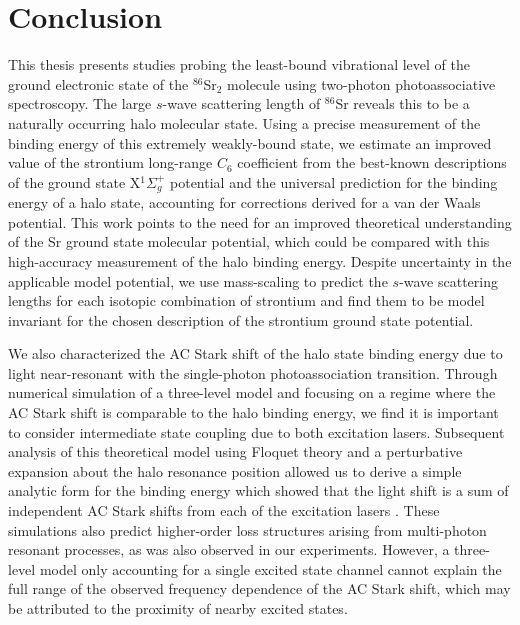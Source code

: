 \chapter{Conclusion} \label{ch:conclusion}
This thesis presents studies probing the least-bound vibrational level of the ground electronic state of the $^{86}$Sr$_2$ molecule using two-photon photoassociative spectroscopy.
The large $s$-wave scattering length of $^{86}$Sr reveals this to be a naturally occurring halo molecular state.
Using a precise measurement of the binding energy of this extremely weakly-bound state, we estimate an improved value of the strontium long-range $C_6$ coefficient from the best-known descriptions of the ground state X$^1\Sigma_g^+$ potential and the universal prediction for the binding energy of a halo state, accounting for corrections derived for a van der Waals potential.
This work points to the need for an improved theoretical understanding of the Sr ground state molecular potential, which could be compared with this high-accuracy measurement of the halo binding energy.
Despite uncertainty in the applicable model potential, we use mass-scaling to predict the $s$-wave scattering lengths for each isotopic combination of strontium and find them to be model invariant for the chosen description of the strontium ground state potential.

We also characterized the AC Stark shift of the halo state binding energy due to light near-resonant with the single-photon photoassociation transition. 
Through numerical simulation of a three-level model and focusing on a regime where the AC Stark shift is comparable to the halo binding energy, we find it is important to consider intermediate state coupling due to both excitation lasers.
Subsequent analysis of this theoretical model using Floquet theory and a perturbative expansion about the halo resonance position allowed us to derive a simple analytic form for the binding energy which showed that the light shift is a sum of independent AC Stark shifts from each of the excitation lasers \cite{Wynar2000,Borkowski2009,Tojo2006}.
These simulations also predict higher-order loss structures arising from multi-photon resonant processes, as was also observed in our experiments.
However, a three-level model only accounting for a single excited state channel \cite{Bohn1996} cannot explain the full range of the observed frequency dependence of the AC Stark shift, which may be attributed to the proximity of nearby excited states.

